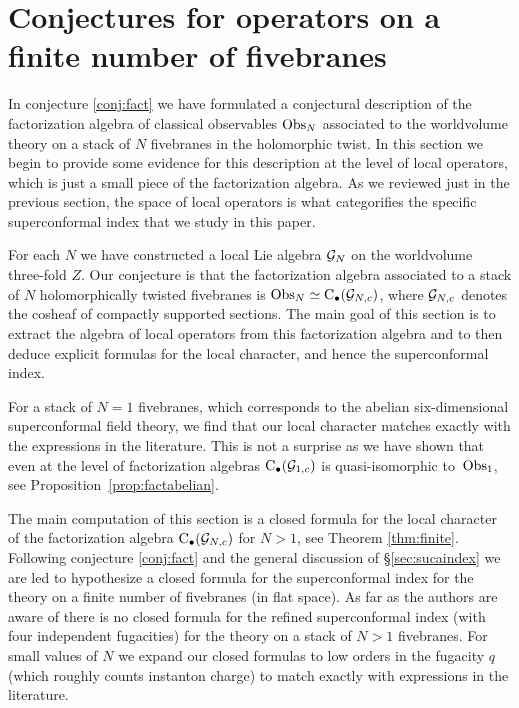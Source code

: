 \section{Conjectures for operators on a finite number of fivebranes}

In conjecture \ref{conj:fact} we have formulated a conjectural description of the factorization algebra of classical observables $\operatorname{Obs}_{N}$ associated to the worldvolume theory on a stack of $N$ fivebranes in the holomorphic twist.
In this section we begin to provide some evidence for this description at the level of local operators, which is just a small piece of the factorization algebra.
As we reviewed just in the previous section, the space of local operators is what categorifies the specific superconformal index that we study in this paper.

For each $N$ we have constructed a local Lie algebra $\mathcal G_N$ on the worldvolume three-fold $Z$. 
Our conjecture is that the factorization algebra associated to a stack of $N$ holomorphically twisted fivebranes is $\operatorname{Obs}_N \simeq {\rm C}_\bullet(\mathcal G_{N,c})$, where $\mathcal G_{N,c}$ denotes the cosheaf of compactly supported sections. 
The main goal of this section is to extract the algebra of local operators from this factorization algebra and to then deduce explicit formulas for the local character, and hence the superconformal index.

For a stack of $N=1$ fivebranes, which corresponds to the abelian six-dimensional superconformal field theory, we find that our local character matches exactly with the expressions in the literature. 
This is not a surprise as we have shown that even at the level of factorization algebras ${\rm C}_\bullet(\mathcal G_{1,c})$ is quasi-isomorphic to~$\operatorname{Obs}_1$, see Proposition~\ref{prop:factabelian}.

The main computation of this section is a closed formula for the local character of the factorization algebra ${\rm C}_\bullet(\mathcal G_{N,c})$ for $N > 1$, see Theorem \ref{thm:finite}. 
Following conjecture \ref{conj:fact} and the general discussion of \S \ref{sec:sucaindex} we are led to hypothesize a closed formula for the superconformal index for the theory on a finite number of fivebranes (in flat space).
As far as the authors are aware of there is no closed formula for the refined superconformal index (with four independent fugacities) for the theory on a stack of $N > 1$ fivebranes.
For small values of $N$ we expand our closed formulas to low orders in the fugacity $q$ (which roughly counts instanton charge) to match exactly with expressions in the literature. 


